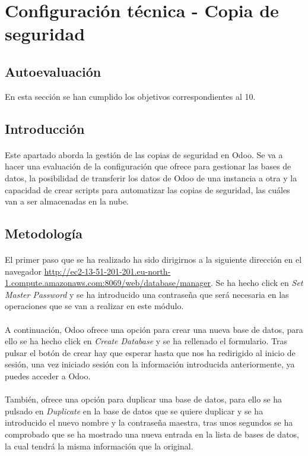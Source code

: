 \section{Configuración técnica - Copia de seguridad}
\subsection{Autoevaluación}
En esta sección se han cumplido los objetivos correspondientes al 10.
\subsection{Introducción}
\paragraph{}
Este apartado aborda la gestión de las copias de seguridad en Odoo. Se va a hacer una evaluación de la configuración que ofrece para gestionar las bases de datos, la posibilidad de transferir los datos de Odoo de una instancia a otra y la capacidad de crear scripts para automatizar las copias de seguridad, las cuáles van a ser almacenadas en la nube.
\subsection{Metodología}
\paragraph{}
El primer paso que se ha realizado ha sido dirigirnos a la siguiente dirección en el navegador \href{http://ec2-13-51-201-201.eu-north-1.compute.amazonaws.com:8069/web/database/manager}{http://ec2-13-51-201-201.eu-north-1.compute.amazonaws.com:8069/web/database/manager}. Se ha hecho click en \textit{Set Master Password} y se ha introducido una contraseña que será necesaria en las operaciones que se van a realizar en este módulo.
\paragraph{}
A continuación, Odoo ofrece una opción para crear una nueva base de datos, para ello se ha hecho click en \textit{Create Database} y se ha rellenado el formulario. Tras pulsar el botón de crear hay que esperar hasta que nos ha redirigido al inicio de sesión, una vez iniciado sesión con la información introducida anteriormente, ya puedes acceder a Odoo. 
\paragraph{}
También, ofrece una opción para duplicar una base de datos, para ello se ha pulsado en \textit{Duplicate} en la base de datos que se quiere duplicar y se ha introducido el nuevo nombre y la contraseña maestra, tras unos segundos se ha comprobado que se ha mostrado una nueva entrada en la lista de bases de datos, la cual tendrá la misma información que la original.
